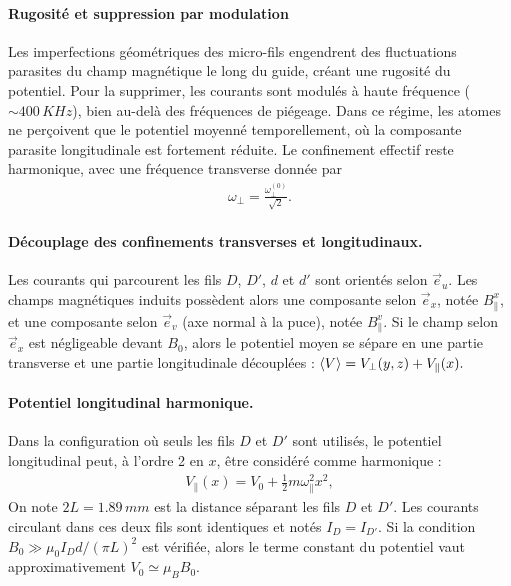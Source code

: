 \paragraph{Rugosité et suppression par modulation}
Les imperfections géométriques des micro-fils engendrent des fluctuations parasites du champ magnétique le long du guide, créant une rugosité du potentiel. Pour la supprimer, les courants sont modulés à haute fréquence ($\sim 400\,KHz$), bien au-delà des fréquences de piégeage. Dans ce régime, les atomes ne perçoivent que le potentiel moyenné temporellement, où la composante parasite longitudinale est fortement réduite. Le confinement effectif reste harmonique, avec une fréquence transverse donnée par
\begin{eqnarray*}
	\omega_\perp = \frac{\omega_\perp^{(0)}}{\sqrt{2}}.		
\end{eqnarray*}




\paragraph{Découplage des confinements transverses et longitudinaux.}
Les courants qui parcourent les fils $D$, $D'$, $d$ et $d'$ sont orientés selon $\vec{e}_u$. 
Les champs magnétiques induits possèdent alors une composante selon $\vec{e}_x$, notée $B_\parallel^x$, et une composante selon $\vec{e}_v$ (axe normal à la puce), notée $B_\parallel^v$. 
Si le champ selon $\vec{e}_x$ est négligeable devant $B_0$, alors le potentiel moyen se sépare en une partie transverse et une partie longitudinale découplées : 
\(
\braket{V} = V_\perp(y,z) + V_\parallel(x) .
\)


\paragraph{Potentiel longitudinal harmonique.}
Dans la configuration où seuls les fils $D$ et $D'$ sont utilisés, le potentiel longitudinal peut, à l’ordre 2 en $x$, être considéré comme harmonique :
\begin{eqnarray*}
	V_\parallel (x) = V_0 + \frac{1}{2} m \omega_\parallel^2 x^2 ,
\end{eqnarray*}
On note  $2L=1.89 \,mm$ est la distance séparant les fils $D$ et $D'$. Les courants circulant dans ces deux fils sont identiques et notés $I_D = I_{D'}$. Si la condition $B_0 \gg \mu_0 I_D d /(\pi L)^2 $ est vérifiée, alors le terme constant du potentiel vaut approximativement $V_0 \simeq \mu_B B_0$.

